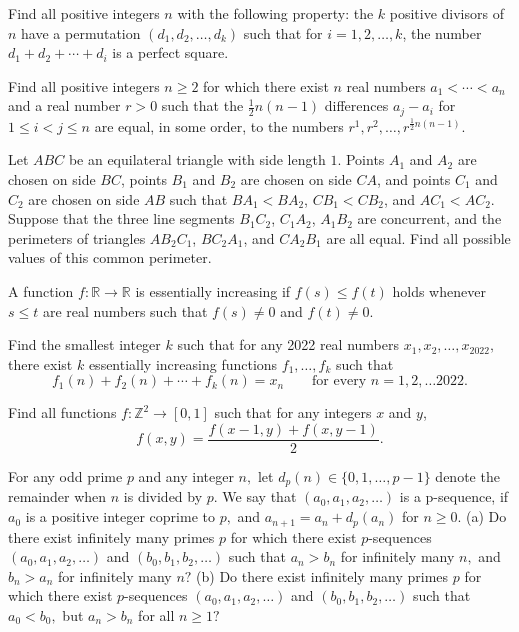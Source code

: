\documentclass[11pt]{scrartcl}
\begin{document}
\begin{problem}[297274918587198]
	Find all positive integers $n$ with the following property: the $k$ positive divisors of $n$ have a permutation $(d_1,d_2,\ldots,d_k)$ such that for $i=1,2,\ldots,k$, the number $d_1+d_2+\cdots+d_i$ is a perfect square.
\end{problem}
\begin{problem}[596902679696332]
Find all positive integers $n \geqslant 2$ for which there exist $n$ real numbers $a_1<\cdots< a_n$ and a real number $r>0$ such that the $\tfrac{1}{2}n(n-1)$ differences $a_j-a_i$ for $1 \leqslant i<j \leqslant n$ are equal, in some order, to the numbers $r^1,r^2,\ldots,r^{\frac{1}{2}n(n-1)}$.
\end{problem}
\begin{problem}[803002459788170506]
	Let $ABC$ be an equilateral triangle with side length $1$. Points $A_1$ and $A_2$ are chosen on side $BC$, points $B_1$ and $B_2$ are chosen on side $CA$, and points $C_1$ and $C_2$ are chosen on side $AB$ such that $BA_1<BA_2$, $CB_1<CB_2$, and $AC_1<AC_2$.
Suppose that the three line segments $B_1C_2$, $C_1A_2$, $A_1B_2$ are concurrent, and the perimeters of triangles $AB_2C_1$, $BC_2A_1$, and $CA_2B_1$ are all equal. Find all possible values of this common perimeter.
\end{problem}
\begin{problem}[8892145789808454835]
A function $f: \mathbb{R}\to \mathbb{R}$ is essentially increasing if $f(s)\leq f(t)$ holds whenever $s\leq t$ are real numbers such that $f(s)\neq 0$ and $f(t)\neq 0$.

Find the smallest integer $k$ such that for any 2022 real numbers $x_1,x_2,\ldots , x_{2022},$ there exist $k$ essentially increasing functions $f_1,\ldots, f_k$ such that\[f_1(n) + f_2(n) + \cdots + f_k(n) = x_n\qquad \text{for every } n= 1,2,\ldots 2022.\]
\end{problem}
\begin{problem}[6360153743145135128]
Find all functions $f\colon \mathbb{Z}^2 \to [0, 1]$ such that for any integers $x$ and $y$,
\[f(x, y) = \frac{f(x - 1, y) + f(x, y - 1)}{2}.\]
\end{problem}
\begin{problem}[522990139281725]
	For any odd prime $p$ and any integer $n,$ let $d_p (n) \in \{ 0,1, \dots, p-1 \}$ denote the remainder when $n$ is divided by $p.$ We say that $(a_0, a_1, a_2, \dots)$ is a p-sequence, if $a_0$ is a positive integer coprime to $p,$ and $a_{n+1} =a_n + d_p (a_n)$ for $n \geqslant 0.$
(a) Do there exist infinitely many primes $p$ for which there exist $p$-sequences $(a_0, a_1, a_2, \dots)$ and $(b_0, b_1, b_2, \dots)$ such that $a_n >b_n$ for infinitely many $n,$ and $b_n > a_n$ for infinitely many $n?$
(b) Do there exist infinitely many primes $p$ for which there exist $p$-sequences $(a_0, a_1, a_2, \dots)$ and $(b_0, b_1, b_2, \dots)$ such that $a_0 <b_0,$ but $a_n >b_n$ for all $n \geqslant 1?$
\end{problem}
\end{document}

